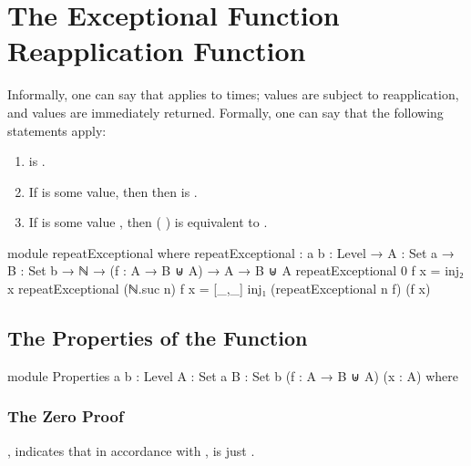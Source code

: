 \documentclass{report}
\begin{document}
\section{The Exceptional Function Reapplication Function}
Informally, one can say that     applies  to   times;  values are subject to reapplication, and  values are immediately returned.  Formally, one can say that the following statements apply:

\begin{enumerate}
  \item {}    is  .\label{enum:repeatExceptional-zeroIsInj2}
  \item If   is some  value, then then     is  .\label{enum:repeatExceptional-inj1GetsReturned}
  \item If   is some value  , then  \AgdaSymbol( \AgdaSymbol)   is equivalent to    .\label{enum:inj2GetsRepeat}
\end{enumerate}

\begin{code}
module repeatExceptional where
  repeatExceptional :
    {a b : Level} →
    {A : Set a} →
    {B : Set b} →
    ℕ → (f : A → B ⊎ A) → A → B ⊎ A
  repeatExceptional 0 f x = inj₂ x
  repeatExceptional (ℕ.suc n) f x = [_,_] inj₁ (repeatExceptional n f) (f x)
\end{code}

\subsection{The Properties of the Function}

\begin{code}
  module Properties
    {a b : Level}
    {A : Set a}
    {B : Set b}
    (f : A → B ⊎ A)
    (x : A) where
\end{code}

\subsubsection{The Zero Proof}
, indicates that in accordance with ,     is just  .
\end{document}
